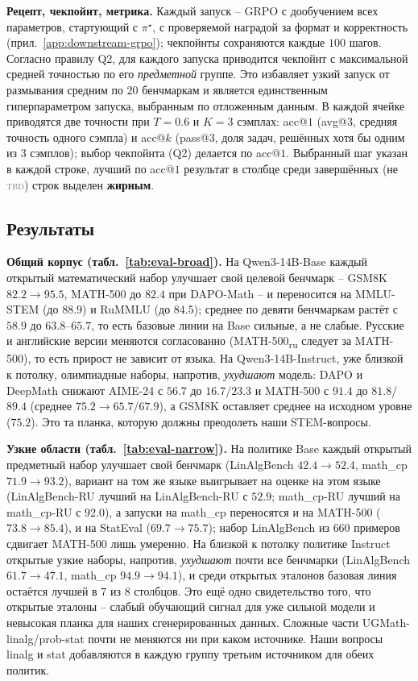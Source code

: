 \documentclass{article}
\newcommand{\tbd}{\textcolor{gray}{\textsc{tbd}}}
\begin{document}
\textbf{Рецепт, чекпойнт, метрика.}
Каждый запуск -- GRPO с дообучением всех параметров, стартующий с $\pi^\star$, с проверяемой наградой за формат и корректность (прил.~\ref{app:downstream-grpo}); чекпойнты сохраняются каждые $100$ шагов. Согласно правилу Q2, для каждого запуска приводится чекпойнт с максимальной средней точностью по его \emph{предметной} группе. Это избавляет узкий запуск от размывания средним по $20$ бенчмаркам и является единственным гиперпараметром запуска, выбранным по отложенным данным. В каждой ячейке приводятся две точности при $T=0.6$ и $K=3$ сэмплах: acc@$1$ (avg@$3$, средняя точность одного сэмпла) и acc@$k$ (pass@$3$, доля задач, решённых хотя бы одним из $3$ сэмплов); выбор чекпойнта (Q2) делается по acc@$1$. Выбранный шаг указан в каждой строке, лучший по acc@$1$ результат в столбце среди завершённых (не \tbd) строк выделен \textbf{жирным}.

\subsection{Результаты}\label{sec:exp-results}

\textbf{Общий корпус (табл.~\ref{tab:eval-broad}).}
На Qwen3-14B-Base каждый открытый математический набор улучшает свой целевой бенчмарк -- GSM8K $82.2\!\to\!95.5$, MATH-500 до $82.4$ при DAPO-Math -- и переносится на MMLU-STEM (до $88.9$) и RuMMLU (до $84.5$); среднее по девяти бенчмаркам растёт с $58.9$ до $63.8$--$65.7$, то есть базовые линии на Base сильные, а не слабые. Русские и английские версии меняются согласованно (MATH-500\textsubscript{ru} следует за MATH-500), то есть прирост не зависит от языка. На Qwen3-14B-Instruct, уже близкой к потолку, олимпиадные наборы, напротив, \emph{ухудшают} модель: DAPO и DeepMath снижают AIME-24 с $56.7$ до $16.7$/$23.3$ и MATH-500 с $91.4$ до $81.8$/$89.4$ (среднее $75.2\!\to\!65.7$/$67.9$), а GSM8K оставляет среднее на исходном уровне ($75.2$). Это та планка, которую должны преодолеть наши STEM-вопросы.

\textbf{Узкие области (табл.~\ref{tab:eval-narrow}).}
На политике Base каждый открытый предметный набор улучшает свой бенчмарк (LinAlgBench $42.4\!\to\!52.4$, math\_cp $71.9\!\to\!93.2$), вариант на том же языке выигрывает на оценке на этом языке (LinAlgBench-RU лучший на LinAlgBench-RU с $52.9$; math\_cp-RU лучший на math\_cp-RU с $92.0$), а запуски на math\_cp переносятся и на MATH-500 ($73.8\!\to\!85.4$), и на StatEval ($69.7\!\to\!75.7$); набор LinAlgBench из $660$ примеров сдвигает MATH-500 лишь умеренно. На близкой к потолку политике Instruct открытые узкие наборы, напротив, \emph{ухудшают} почти все бенчмарки (LinAlgBench $61.7\!\to\!47.1$, math\_cp $94.9\!\to\!94.1$), и среди открытых эталонов базовая линия остаётся лучшей в $7$ из $8$ столбцов. Это ещё одно свидетельство того, что открытые эталоны -- слабый обучающий сигнал для уже сильной модели и невысокая планка для наших сгенерированных данных. Сложные части UGMath-linalg/prob-stat почти не меняются ни при каком источнике. Наши вопросы linalg и stat добавляются в каждую группу третьим источником для обеих политик.
\end{document}
